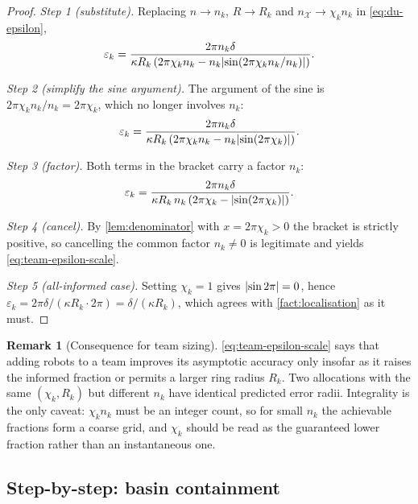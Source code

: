 \documentclass[11pt,a4paper]{article}
\theoremstyle{plain}
\theoremstyle{definition}
\newtheorem{remark}{Remark}
\DeclarePairedDelimiter{\abs}{\lvert}{\rvert}
\begin{document}
\begin{proof}
\emph{Step 1 (substitute).} Replacing $n\to n_k$, $R\to R_k$ and
$n_{\mathcal X}\to\chi_kn_k$ in \eqref{eq:du-epsilon},
\begin{equation*}
    \varepsilon_k
    =\frac{2\pi n_k\delta}
    {\kappa R_k\left(2\pi\chi_kn_k-n_k\abs{\sin\!\left(2\pi\chi_kn_k/n_k\right)}\right)}.
\end{equation*}

\emph{Step 2 (simplify the sine argument).} The argument of the sine is
$2\pi\chi_kn_k/n_k=2\pi\chi_k$, which no longer involves $n_k$:
\begin{equation*}
    \varepsilon_k
    =\frac{2\pi n_k\delta}
    {\kappa R_k\left(2\pi\chi_kn_k-n_k\abs{\sin\!\left(2\pi\chi_k\right)}\right)}.
\end{equation*}

\emph{Step 3 (factor).} Both terms in the bracket carry a factor $n_k$:
\begin{equation*}
    \varepsilon_k
    =\frac{2\pi n_k\delta}
    {\kappa R_k\,n_k\left(2\pi\chi_k-\abs{\sin\!\left(2\pi\chi_k\right)}\right)}.
\end{equation*}

\emph{Step 4 (cancel).} By \cref{lem:denominator} with $x=2\pi\chi_k>0$ the bracket is strictly
positive, so cancelling the common factor $n_k\neq0$ is legitimate and yields
\eqref{eq:team-epsilon-scale}.

\emph{Step 5 (all-informed case).} Setting $\chi_k=1$ gives
$\abs{\sin2\pi}=0$, hence
$\varepsilon_k=2\pi\delta/(\kappa R_k\cdot2\pi)=\delta/(\kappa R_k)$, which agrees with
\cref{fact:localisation} as it must.
\end{proof}

\begin{remark}[Consequence for team sizing]\label{rem:team-sizing}
\eqref{eq:team-epsilon-scale} says that adding robots to a team improves its asymptotic accuracy
only insofar as it raises the informed fraction or permits a larger ring radius $R_k$. Two
allocations with the same $(\chi_k,R_k)$ but different $n_k$ have identical predicted error
radii. Integrality is the only caveat: $\chi_kn_k$ must be an integer count, so for small $n_k$
the achievable fractions form a coarse grid, and $\chi_k$ should be read as the guaranteed lower
fraction rather than an instantaneous one.
\end{remark}

\subsection{Step-by-step: basin containment}\label{sec:gap1-basin}
\end{document}
